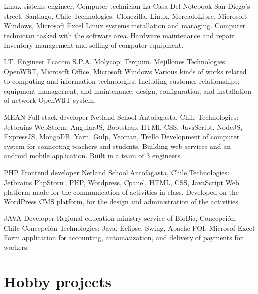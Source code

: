 \documentclass[draft,color,12pt,letterpaper,sans]{moderncv}
\begin{document}
{Linux sistems engineer. Computer technician}
{La Casa Del Notebook}
{San Diego's street, Santiago, Chile}
{\newline Technologies: Clonezilla, Linux, MercadoLibre, Microsoft Windows, Microsoft Excel}
{Linux systems installation and managing. Computer technician tasked with the software area. Hardware maintenance and repair. Inventory management and selling of computer equipment.\newline} 

{I.T. Engineer}
{Ecacom S.P.A.}
{Molycop; Terquim. Mejillones}
{\newline Technologies: OpenWRT, Microsoft Office, Microsoft Windows}
{Various kinds of works related to computing and information technologies. Including customer relationships; equipment management, and maintenance; design, configuration, and installation of network OpenWRT system.\newline}

{MEAN Full stack developer}
{Netland School}
{Antofagasta, Chile}
{\newline Technologies: Jetbrains WebStorm, AngularJS, Bootstrap, HTMl, CSS, JavaScript, NodeJS, ExpressJS, MongoDB, Yarn, Gulp, Yeoman, Trello}
{Development of computer system for connecting teachers and students. Building web services and an android mobile application. Built in a team of 3 engineers.\newline}

{PHP Frontend developer}
{Netland School}
{Antofagasta, Chile}
{\newline Technologies: Jetbrains PhpStorm, PHP, Wordpress, Cpanel, HTML, CSS, JavaScript}
{Web platform made for the communication of activities in class. Developed on the WordPress CMS platform, for the design and administration of the activities.\newline}

{JAVA Developer}
{Regional education ministry service of BioBio, Concepci\'on, Chile}
{Concepci\'on}
{\newline Technologies: Java, Eclipse, Swing, Apache POI, Microsof Excel}
{Form application for accounting, automatization, and delivery of payments for workers.\newline}


\section{Hobby projects}
\end{document}
